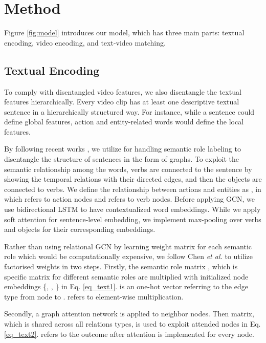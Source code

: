 \documentclass[lettersize,journal]{IEEEtran}
\begin{document}
\section{Method}

Figure \ref{fig:model} introduces our model, which has three main parts: textual encoding, video encoding, and text-video matching.

\subsection{Textual Encoding}
To comply with disentangled video features, we also disentangle the textual features hierarchically. Every video clip has at least one descriptive textual sentence in a hierarchically structured way. For instance, while a sentence could define global features, action and entity-related words would define the local features.

By following recent works \cite{satar_2021, Chen_2020_CVPR}, we utilize \cite{shi2019simple} for handling semantic role labeling to disentangle the structure of sentences in the form of graphs. To exploit the semantic relationship among the words, verbs are connected to the sentence by showing the temporal relations with their directed edges, and then the objects are connected to verbs. We define the relationship between actions and entities as , in which  refers to action nodes and  refers to verb nodes. Before applying GCN, we use bidirectional LSTM to have contextualized word embeddings. While we apply soft attention for sentence-level embedding, we implement max-pooling over verbs and objects for their corresponding embeddings.  

Rather than using relational GCN \cite{rgcn} by learning weight matrix for each semantic role which would be computationally expensive, we follow Chen \textit{et al.} \cite{Chen_2020_CVPR} to utilize factorised weights in two steps. Firstly, the semantic role matrix , which is specific matrix for different semantic roles are multiplied with initialized node embeddings   \{, , \} in Eq. \ref{eq_text1}.  is an one-hot vector referring to the edge type from node  to .  refers to element-wise multiplication.



Secondly, a graph attention network is applied to neighbor nodes. Then  matrix, which is shared across all relations types, is used to exploit attended nodes in Eq. \ref{eq_text2}.  refers to the outcome after attention is implemented for every node.
\end{document}
